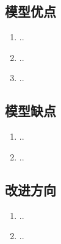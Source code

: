 \documentclass[withoutpreface,bwprint]{cumcmthesis} %
\begin{document}
\subsection{模型优点}
\begin{enumerate}
    \item ..
    \item ..
    \item ..
\end{enumerate}

\subsection{模型缺点}
\begin{enumerate}
    \item ..
    \item ..
\end{enumerate}

\subsection{改进方向}
\begin{enumerate}
    \item ..
    \item ..
\end{enumerate}



\end{document}
